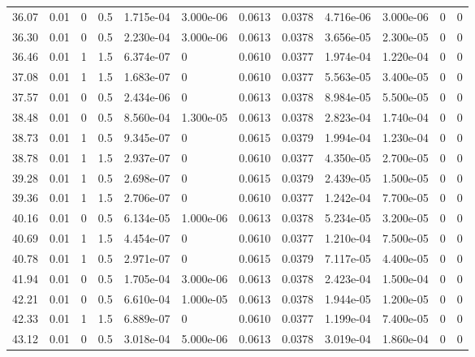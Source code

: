 \documentclass[preview]{standalone}
\begin{document}
{{{\begin{tabular}{L{1.2cm}C{1.2cm} C{0.3cm}C{0.5cm} C{1.4cm}C{1.4cm} C{1.4cm}C{1.4cm} C{1.6cm}C{1.6cm} C{1.6cm}C{1.6cm}}
  36.07  &  0.01  & 0     & 0.5 &  1.715e-04  & 3.000e-06  &  0.0613&   0.0378& 4.716e-06 & 3.000e-06   &  0 & 0  \\ 
  36.30  &  0.01  & 0     & 0.5 &  2.230e-04  & 3.000e-06  &  0.0613&   0.0378& 3.656e-05 & 2.300e-05   &  0 & 0  \\ 
  36.46  &  0.01  & 1     & 1.5 &  6.374e-07  & 0  &  0.0610&   0.0377& 1.974e-04 & 1.220e-04   &  0 & 0  \\ 
  37.08  &  0.01  & 1     & 1.5 &  1.683e-07  & 0  &  0.0610&   0.0377& 5.563e-05 & 3.400e-05   &  0 & 0  \\ 
  37.57  &  0.01  & 0     & 0.5 &  2.434e-06  & 0  &  0.0613&   0.0378& 8.984e-05 & 5.500e-05   &  0 & 0  \\ 
  38.48  &  0.01  & 0     & 0.5 &  8.560e-04  & 1.300e-05  &  0.0613&   0.0378& 2.823e-04 & 1.740e-04   &  0 & 0  \\ 
  38.73  &  0.01  & 1     & 0.5 &  9.345e-07  & 0  &  0.0615&   0.0379& 1.994e-04 & 1.230e-04   &  0 & 0  \\ 
  38.78  &  0.01  & 1     & 1.5 &  2.937e-07  & 0  &  0.0610&   0.0377& 4.350e-05 & 2.700e-05   &  0 & 0  \\ 
  39.28  &  0.01  & 1     & 0.5 &  2.698e-07  & 0  &  0.0615&   0.0379& 2.439e-05 & 1.500e-05   &  0 & 0  \\ 
  39.36  &  0.01  & 1     & 1.5 &  2.706e-07  & 0  &  0.0610&   0.0377& 1.242e-04 & 7.700e-05   &  0 & 0  \\ 
  40.16  &  0.01  & 0     & 0.5 &  6.134e-05  & 1.000e-06  &  0.0613&   0.0378& 5.234e-05 & 3.200e-05   &  0 & 0  \\ 
  40.69  &  0.01  & 1     & 1.5 &  4.454e-07  & 0  &  0.0610&   0.0377& 1.210e-04 & 7.500e-05   &  0 & 0  \\ 
  40.78  &  0.01  & 1     & 0.5 &  2.971e-07  & 0  &  0.0615&   0.0379& 7.117e-05 & 4.400e-05   &  0 & 0  \\ 
  41.94  &  0.01  & 0     & 0.5 &  1.705e-04  & 3.000e-06  &  0.0613&   0.0378& 2.423e-04 & 1.500e-04   &  0 & 0  \\ 
  42.21  &  0.01  & 0     & 0.5 &  6.610e-04  & 1.000e-05  &  0.0613&   0.0378& 1.944e-05 & 1.200e-05   &  0 & 0  \\ 
  42.33  &  0.01  & 1     & 1.5 &  6.889e-07  & 0  &  0.0610&   0.0377& 1.199e-04 & 7.400e-05   &  0 & 0  \\ 
  43.12  &  0.01  & 0     & 0.5 &  3.018e-04  & 5.000e-06  &  0.0613&   0.0378& 3.019e-04 & 1.860e-04   &  0 & 0  \\ 

\end{tabular}}}}
\end{document}
